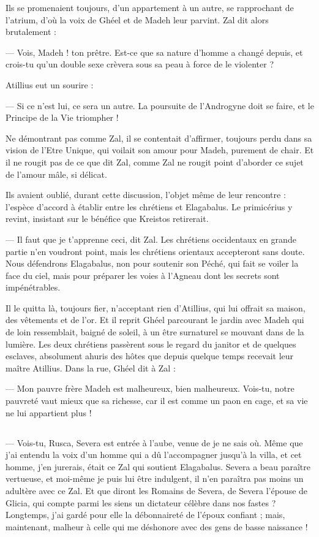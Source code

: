 \documentclass[a4paper, 11pt, oneside, polutonikogreek, french]{article}
\begin{document}
Ils se promenaient toujours, d'un appartement à un autre, se rapprochant de l'atrium, d'où la voix de Ghéel et de Madeh leur parvint. Zal dit alors brutalement :

--- Vois, Madeh ! ton prêtre. Est-ce que sa nature d'homme a changé depuis, et crois-tu qu'un double sexe crèvera sous sa peau à force de le violenter ?

Atillius eut un sourire :

--- Si ce n'est lui, ce sera un autre. La poursuite de l'Androgyne doit se faire, et le Principe de la Vie triompher !

Ne démontrant pas comme Zal, il se contentait d'affirmer, toujours perdu dans sa vision de l'Etre Unique, qui voilait son amour pour Madeh, purement de chair. Et il ne rougit pas de ce que dit Zal, comme Zal ne rougit point d'aborder ce sujet de l'amour mâle, si délicat.

Ils avaient oublié, durant cette discussion, l'objet même de leur rencontre : l'espèce d'accord à établir entre les chrétiens et Elagabalus. Le primicérius y revint, insistant sur le bénéfice que Kreistos retirerait.

--- Il faut que je t'apprenne ceci, dit Zal. Les chrétiens occidentaux en grande partie n'en voudront point, mais les chrétiens orientaux accepteront sans doute. Nous défendrons Elagabalus, non pour soutenir son Péché, qui fait se voiler la face du ciel, mais pour préparer les voies à l'Agneau dont les secrets sont impénétrables.

Il le quitta là, toujours fier, n'acceptant rien d'Atillius, qui lui offrait sa maison, des vêtements et de l'or. Et il reprit Ghéel parcourant le jardin avec Madeh qui de loin ressemblait, baigné de soleil, à un être surnaturel se mouvant dans de la lumière. Les deux chrétiens passèrent sous le regard du janitor et de quelques esclaves, absolument ahuris des hôtes que depuis quelque temps recevait leur maître Atillius. Dans la rue, Ghéel dit à Zal :

--- Mon pauvre frère Madeh est malheureux, bien malheureux. Vois-tu, notre pauvreté vaut mieux que sa richesse, car il est comme un paon en cage, et sa vie ne lui appartient plus !
\clearpage
\subsection{}
\paragraph{}
--- Vois-tu, Rusca, Severa est entrée à l'aube, venue de je ne sais où. Même que j'ai entendu la voix d'un homme qui a dû l'accompagner jusqu'à la villa, et cet homme, j'en jurerais, était ce Zal qui soutient Elagabalus. Severa a beau paraître vertueuse, et moi-même je puis lui être indulgent, il n'en paraîtra pas moins un adultère avec ce Zal. Et que diront les Romains de Severa, de Severa l'épouse de Glicia, qui compte parmi les siens un dictateur célèbre dans nos fastes ? Longtemps, j'ai gardé pour elle la débonnaireté de l'époux confiant ; mais, maintenant, malheur à celle qui me déshonore avec des gens de basse naissance !
\end{document}
